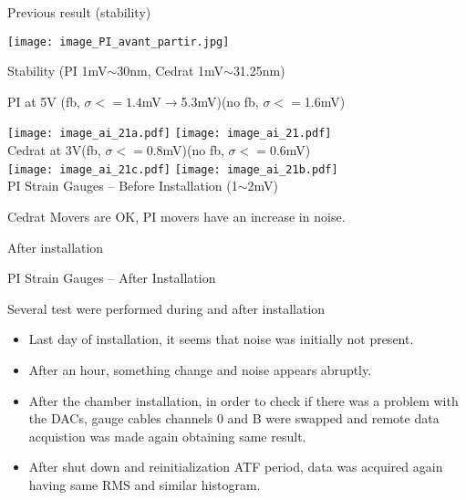 Previous result (stability)\par
 \texttt{[image: image\_PI\_avant\_partir.jpg]}\par
Stability (PI 1mV$\sim$30nm, Cedrat 1mV$\sim$31.25nm)\par
PI at 5V \hspace{0.5cm}(fb, $\sigma<=1.4$mV$\rightarrow${\color{red}5.3mV})\hspace{0.4cm}(no fb, $\sigma<=$1.6mV)\par
 \hspace*{2cm}\texttt{[image: image\_ai\_21a.pdf]}
 \texttt{[image: image\_ai\_21.pdf]}\\
Cedrat at 3V\hspace{0.4cm}(fb, $\sigma<=0.8$mV)\hspace{1.0cm}(no fb, $\sigma<=0.6$mV)\\
  \hspace*{2cm}\texttt{[image: image\_ai\_21c.pdf]}
 \texttt{[image: image\_ai\_21b.pdf]}\\ 
PI Strain Gauges -- Before Installation (1$\sim$2mV)\par
Cedrat Movers are {\color{green}OK}, PI movers have an {\color{red}increase in noise}.
\par
After installation\par
PI Strain Gauges -- After Installation\par
 Several test were performed during and after installation\par
 \begin{itemize}
  \item Last day of installation, it seems that noise was initially not present.
  \item After an hour, something change and noise appears abruptly.
  \item After the chamber installation, in order to check if there was a problem with the DACs, gauge cables channels 0 and B were swapped and remote data acquistion was made again obtaining same result.
  \item After shut down and reinitialization ATF period, data was acquired again having same RMS and similar histogram.
 \end{itemize}
